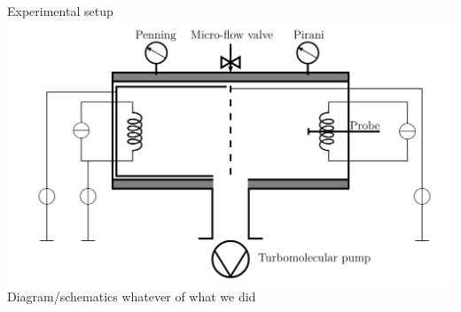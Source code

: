 \documentclass[10pt]{beamer}
\begin{document}
\begin{frame}{Experimental setup}
    \centering
    \includegraphics[width=\textwidth]{../figures/experimental_setup_Willemin_Zahar.png} 
    \\
    Diagram/schematics whatever of what we did
\end{frame}
\end{document}
